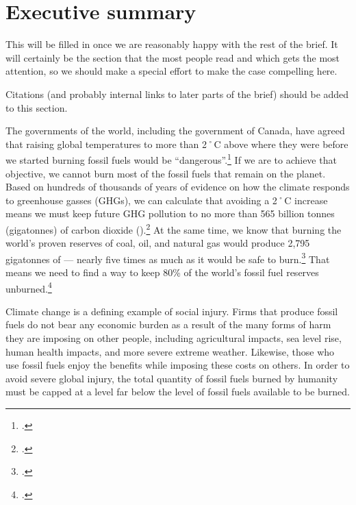 
		\section{Executive summary}

\begin{vcom}
This will be filled in once we are reasonably happy with the rest of the brief. It will certainly be the section that the most people read and which gets the most attention, so we should make a special effort to make the case compelling here.
\end{vcom}


\begin{vcom}
	Citations (and probably internal links to later parts of the brief) should be added to this section.
\end{vcom}


The governments of the world, including the government of Canada, have agreed that raising global temperatures to more than 2˚C above where they were before we started burning fossil fuels would be ``dangerous''.\footcite[][]{CopenhagenAccord}
If we are to achieve that objective, we cannot burn most of the fossil fuels that remain on the planet.
Based on hundreds of thousands of years of evidence on how the climate responds to greenhouse gasses (GHGs), we can calculate that avoiding a 2˚C increase means we must keep future GHG pollution to no more than 565 billion tonnes (gigatonnes) of carbon dioxide ().\footcite[For an excellent summary that is accessible to non-experts see: ][]{TerrifyingNewMath}
At the same time, we know that burning the world's proven reserves of coal, oil, and natural gas would produce 2,795 gigatonnes of  --- nearly five times as much as it would be safe to burn.\footcite[][]{CTI2012}
That means we need to find a way to keep 80\% of the world's fossil fuel reserves unburned.\footcite[Another accessible summary of the issue can be found in: ][]{HotBackyard}



Climate change is a defining example of social injury.
Firms that produce fossil fuels do not bear any economic burden as a result of the many forms of harm they are imposing on other people, including agricultural impacts, sea level rise, human health impacts, and more severe extreme weather.
Likewise, those who use fossil fuels enjoy the benefits while imposing these costs on others.
In order to avoid severe global injury, the total quantity of fossil fuels burned by humanity must be capped at a level far below the level of fossil fuels available to be burned.



